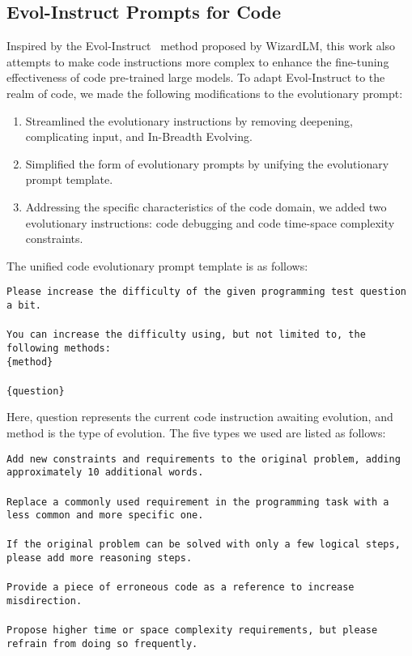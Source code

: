 \documentclass{article}
\begin{document}
\subsection{Evol-Instruct Prompts for Code}
Inspired by the Evol-Instruct~\cite{xu2023wizardlm} method proposed by WizardLM, this work also attempts to make code instructions more complex to enhance the fine-tuning effectiveness of code pre-trained large models. To adapt Evol-Instruct to the realm of code, we made the following modifications to the evolutionary prompt:
\begin{enumerate}
\item Streamlined the evolutionary instructions by removing deepening, complicating input, and In-Breadth Evolving.
\item Simplified the form of evolutionary prompts by unifying the evolutionary prompt template.
\item Addressing the specific characteristics of the code domain, we added two evolutionary instructions: code debugging and code time-space complexity constraints.
\end{enumerate}
The unified code evolutionary prompt template is as follows:
\begin{boxEnv}
\texttt{Please increase the difficulty of the given programming test question a bit. \\\\You can increase the difficulty using, but not limited to, the following methods:\\ \{method\}\\\\ \{question\}}
\end{boxEnv}
Here, question represents the current code instruction awaiting evolution, and method is the type of evolution. The five types we used are listed as follows:
\begin{boxEnv}
\texttt{Add new constraints and requirements to the original problem, adding approximately 10 additional words.\\\\Replace a commonly used requirement in the programming task with a less common and more specific one.\\\\If the original problem can be solved with only a few logical steps, please add more reasoning steps.\\\\Provide a piece of erroneous code as a reference to increase misdirection.\\\\Propose higher time or space complexity requirements, but please refrain from doing so frequently.}
\end{boxEnv}
\end{document}
